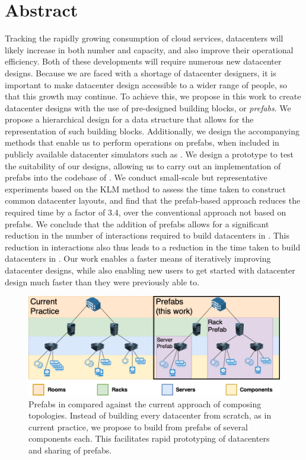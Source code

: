 \documentclass[11pt]{article}
\begin{document}
\newpage


\setcounter{tocdepth}{2}
\tableofcontents
\newpage
\listoffigures
\listoftables
\newpage


\section*{Abstract}
Tracking the rapidly growing consumption of cloud services, datacenters will likely increase in both number and capacity, and also improve their operational efficiency. 
Both of these developments will require numerous new datacenter designs.
Because we are faced with a shortage of datacenter designers, it is important to make datacenter design accessible to a wider range of people, so that this growth may continue. 
To achieve this, we propose in this work to create datacenter designs with the use of pre-designed building blocks, or \textit{prefabs}. 
We propose a hierarchical design for a data structure that allows for the representation of such building blocks.
Additionally, we design the accompanying methods that enable us to perform operations on prefabs, when included in publicly available datacenter simulators such as \opendc{}. 
We design a prototype to test the suitability of our designs, allowing us to carry out an implementation of prefabs into the codebase of \opendc{}. 
We conduct small-scale but representative experiments based on the KLM method to assess the time taken to construct common datacenter layouts, and find that the prefab-based approach reduces the required time by a factor of 3.4, over the conventional approach not based on prefabs.
We conclude that the addition of prefabs allows for a significant reduction in the number of interactions required to build datacenters in \opendc{}. 
This reduction in interactions also thus leads to a reduction in the time taken to build datacenters in \opendc{}.
Our work enables a faster means of iteratively improving datacenter designs, while also enabling new users to get started with datacenter design much faster than they were previously able to.
\newpage

\begin{figure}
	\centering
	\includegraphics[width=\textwidth]{thesis_header.png}
	\caption[Topology composition in \opendc{} using prefabs]{Prefabs in \opendc{} compared against the current approach of composing topologies. Instead of building every datacenter from scratch, as in current practice, we propose to build from prefabs of several components each. This facilitates rapid prototyping of datacenters and sharing of prefabs.}
	\label{fig:prefabsheader}
\end{figure}
\end{document}

